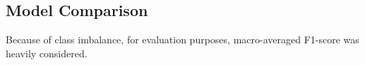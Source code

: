 



\subsection{Model Comparison}
Because of class imbalance, for evaluation purposes,
macro-averaged F1-score was heavily considered.